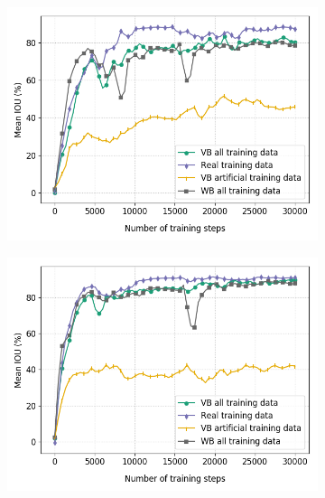 	\begin{figure}
		\begin{subfigure}{.5\textwidth}
			\centering
			\includegraphics[width=1\linewidth]{images/re_val_xcep_full}
		\end{subfigure}
		\begin{subfigure}{.5\textwidth}
			\centering
			\includegraphics[width=1\linewidth]{images/re_val_xcep_size}
			\caption{}
		\end{subfigure}
		\begin{subfigure}{.5\textwidth}
			\centering

\end{subfigure}
\end{figure}
